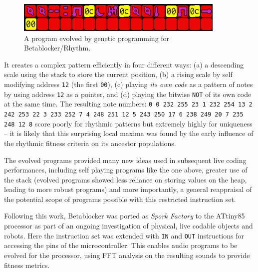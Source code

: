 \documentclass[letterpaper, 12pt]{article}
\begin{document}
\begin{figure}[H]
	\centering
		\includegraphics[width=10cm]{evolved}
	\caption{A program evolved by genetic programming for Betablocker/Rhythm.}
	\label{fig:evolved}
\end{figure}

It creates a complex pattern efficiently in four different ways:
 (a) a descending scale using the stack to store the current position,
 (b) a rising scale by self modifying address \texttt{12} (the first \texttt{00}),
 (c) playing \emph{its own code} as a pattern of notes by using address \texttt{12} as a pointer, and
 (d) playing the bitwise \texttt{NOT} of its own code at the same time.
%
%
The resulting note numbers: \texttt{0 0 232 255 23 1 232 254 13 2 242 253 22 3 233 252 7 4 248 251 12 5 243 250 17 6 238 249 20 7 235 248 12 8} score poorly for rhythmic patterns but extremely highly for uniqueness -- it is likely that this surprising local maxima was found by the early influence of the rhythmic fitness criteria on its ancestor populations.

The evolved programs provided many new ideas used in subsequent live coding performances,  including self playing programs like the one above, greater use of the stack (evolved programs showed less reliance on storing values on the heap, leading to more robust programs) and more importantly, a general reappraisal of the potential scope of programs possible with this restricted instruction set.

Following this work, Betablocker was ported as \emph{Spork Factory} to the ATtiny85 processor as part of an ongoing investigation of physical, live codable objects and robots.
Here the instruction set was extended with \texttt{IN} and \texttt{OUT} instructions for accessing the pins of the microcontroller.
This enables audio programs to be evolved for the processor, using FFT analysis on the resulting sounds to provide fitness metrics.
\parskip 18pt
\end{document}
